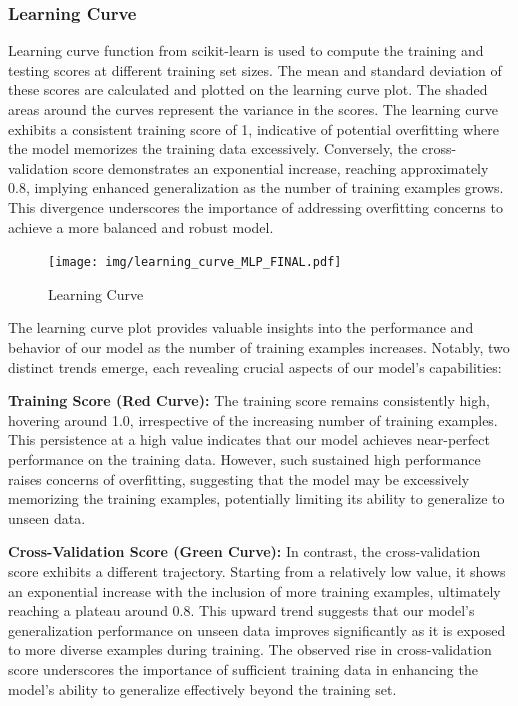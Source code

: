\subsubsection{Learning Curve}
Learning curve function from scikit-learn is used to compute the training and testing scores at different training set sizes. The mean and standard deviation of these scores are calculated and plotted on the learning curve plot. The shaded areas around the curves represent the variance in the scores. The learning curve exhibits a consistent training score of 1, indicative of potential overfitting where the model memorizes the training data excessively. Conversely, the cross-validation score demonstrates an exponential increase, reaching approximately 0.8, implying enhanced generalization as the number of training examples grows. This divergence underscores the importance of addressing overfitting concerns to achieve a more balanced and robust model.
\vspace{0.4cm}
\begin{figure}[ht]
\centering
\texttt{[image: img/learning\_curve\_MLP\_FINAL.pdf]}
\caption{Learning Curve}
\label{fig:system-overview}
\end{figure}
The learning curve plot provides valuable insights into the performance and behavior of our model as the number of training examples increases. Notably, two distinct trends emerge, each revealing crucial aspects of our model's capabilities:

\textbf{Training Score (Red Curve):} The training score remains consistently high, hovering around 1.0, irrespective of the increasing number of training examples. This persistence at a high value indicates that our model achieves near-perfect performance on the training data. However, such sustained high performance raises concerns of overfitting, suggesting that the model may be excessively memorizing the training examples, potentially limiting its ability to generalize to unseen data.

\textbf{Cross-Validation Score (Green Curve):} In contrast, the cross-validation score exhibits a different trajectory. Starting from a relatively low value, it shows an exponential increase with the inclusion of more training examples, ultimately reaching a plateau around 0.8. This upward trend suggests that our model's generalization performance on unseen data improves significantly as it is exposed to more diverse examples during training. The observed rise in cross-validation score underscores the importance of sufficient training data in enhancing the model's ability to generalize effectively beyond the training set.
